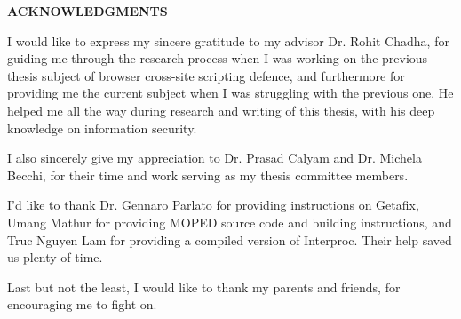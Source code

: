 \newpage
{}
\setcounter{page}{2}

\centerline{\bf \large ACKNOWLEDGMENTS}
\vskip 10mm %
I would like to express my sincere gratitude to my advisor Dr. Rohit Chadha, for guiding me through the research process when I was working on the previous thesis subject of browser cross-site scripting defence, and furthermore for providing me the current subject when I was struggling with the previous one. He helped me all the way during research and writing of this thesis, with his deep knowledge on information security.

I also sincerely give my appreciation to Dr. Prasad Calyam and Dr. Michela Becchi, for their time and work serving as my thesis committee members.

I'd like to thank Dr. Gennaro Parlato for providing instructions on Getafix, Umang Mathur for providing MOPED source code and building instructions, and Truc Nguyen Lam for providing a compiled version of Interproc. Their help saved us plenty of time. 

Last but not the least, I would like to thank my parents and friends, for encouraging me to fight on.
